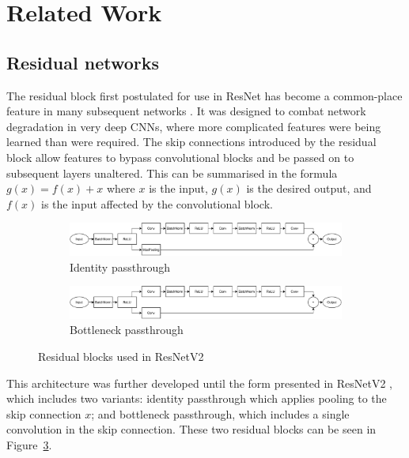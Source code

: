 \documentclass{article}
\begin{document}
	
	\section{Related Work}
	\label{sec:background}
	\subsection{Residual networks}
	
	The residual block first postulated for use in ResNet has become a common-place feature in many subsequent networks \cite{resnetv1,inception,densenet}. It was designed to combat network degradation in very deep CNNs, where more complicated features were being learned than were required. The skip connections introduced by the residual block allow features to bypass convolutional blocks and be passed on to subsequent layers unaltered. This can be summarised in the formula $g(x) = f(x) + x$ where $x$ is the input, $g(x)$ is the desired output, and $f(x)$ is the input affected by the convolutional block.
	
	\begin{figure}[t!]
		\centering
		\begin{subfigure}[b]{\textwidth}
			\centering
			\includegraphics[width=\textwidth]{images/identity_base.pdf}
			\caption{Identity passthrough}
			\label{fig:resnet-identity}
		\end{subfigure}
		\vfill
		\begin{subfigure}[b]{\textwidth}
			\centering
			\includegraphics[width=\textwidth]{images/bottleneck_base.pdf}
			\caption{Bottleneck passthrough}
			\label{fig:resnet-bottleneck}
		\end{subfigure}
		\caption{Residual blocks used in ResNetV2}
		\label{fig:resnet}
	\end{figure}
	
	This architecture was further developed until the form presented in ResNetV2 \cite{resnetv2}, which includes two variants: identity passthrough which applies pooling to the skip connection $x$; and bottleneck passthrough, which includes a single convolution in the skip connection. These two residual blocks can be seen in Figure~\ref{fig:resnet}.
	
\end{document}

